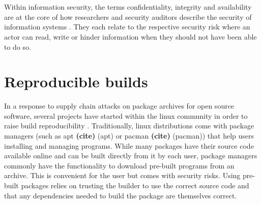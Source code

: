 \documentclass[english, biblatex, digitaloutput]{kththesis}
\begin{document}





\section{}

Within information security, the terms confidentiality, integrity and availability are at the core of how researchers and security auditors describe the security of information systems \cite{samonas_cia_nodate}. They each relate to the respective security risk where an actor can read, write or hinder information when they should not have been able to do so.

\section{Reproducible builds}

In a response to supply chain attacks on package archives for open source software, several projects have started within the linux community in order to raise build reproducibility \cite{reproducible_builds_project}. Traditionally, linux distributions come with package managers (such as apt \textbf{(cite)} (apt) or pacman \textbf{(cite)} (pacman)) that help users installing and managing programs. While many packages have their source code available online and can be built directly from it by each user, package managers commonly have the functionality to download pre-built programs from an archive. This is convenient for the user but comes with security risks. Using pre-built packages relies on trusting the builder to use the correct source code and that any dependencies needed to build the package are themselves correct.
\end{document}
